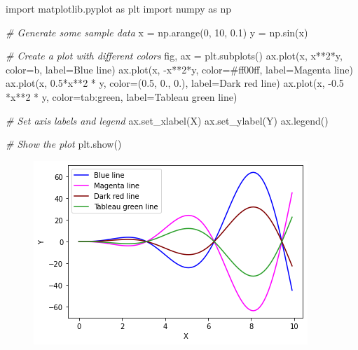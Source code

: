 \documentclass[11pt]{article}
\newenvironment{Shaded}{}{}
\newcommand{\DecValTok}[1]{\textcolor[rgb]{0.25,0.63,0.44}{{#1}}}
\newcommand{\FloatTok}[1]{\textcolor[rgb]{0.25,0.63,0.44}{{#1}}}
\newcommand{\StringTok}[1]{\textcolor[rgb]{0.25,0.44,0.63}{{#1}}}
\newcommand{\CommentTok}[1]{\textcolor[rgb]{0.38,0.63,0.69}{\textit{{#1}}}}
\newcommand{\NormalTok}[1]{{#1}}
\newcommand{\ImportTok}[1]{{#1}}
\newcommand{\OperatorTok}[1]{\textcolor[rgb]{0.40,0.40,0.40}{{#1}}}
\begin{document}
\begin{Shaded}
\begin{Highlighting}[]
\ImportTok{import}\NormalTok{ matplotlib.pyplot }\ImportTok{as}\NormalTok{ plt}
\ImportTok{import}\NormalTok{ numpy }\ImportTok{as}\NormalTok{ np}

\CommentTok{\# Generate some sample data}
\NormalTok{x }\OperatorTok{=}\NormalTok{ np.arange(}\DecValTok{0}\NormalTok{, }\DecValTok{10}\NormalTok{, }\FloatTok{0.1}\NormalTok{)}
\NormalTok{y }\OperatorTok{=}\NormalTok{ np.sin(x)}

\CommentTok{\# Create a plot with different colors}
\NormalTok{fig, ax }\OperatorTok{=}\NormalTok{ plt.subplots()}
\NormalTok{ax.plot(x, x}\OperatorTok{**}\DecValTok{2}\OperatorTok{*}\NormalTok{y, color}\OperatorTok{=}\StringTok{\textquotesingle{}b\textquotesingle{}}\NormalTok{, label}\OperatorTok{=}\StringTok{\textquotesingle{}Blue line\textquotesingle{}}\NormalTok{)}
\NormalTok{ax.plot(x, }\OperatorTok{{-}}\NormalTok{x}\OperatorTok{**}\DecValTok{2}\OperatorTok{*}\NormalTok{y, color}\OperatorTok{=}\StringTok{\textquotesingle{}\#ff00ff\textquotesingle{}}\NormalTok{, label}\OperatorTok{=}\StringTok{\textquotesingle{}Magenta line\textquotesingle{}}\NormalTok{)}
\NormalTok{ax.plot(x, }\FloatTok{0.5}\OperatorTok{*}\NormalTok{x}\OperatorTok{**}\DecValTok{2} \OperatorTok{*}\NormalTok{ y, color}\OperatorTok{=}\NormalTok{(}\FloatTok{0.5}\NormalTok{, }\FloatTok{0.}\NormalTok{, }\FloatTok{0.}\NormalTok{), label}\OperatorTok{=}\StringTok{\textquotesingle{}Dark red line\textquotesingle{}}\NormalTok{)}
\NormalTok{ax.plot(x, }\OperatorTok{{-}}\FloatTok{0.5} \OperatorTok{*}\NormalTok{x}\OperatorTok{**}\DecValTok{2} \OperatorTok{*}\NormalTok{ y, color}\OperatorTok{=}\StringTok{\textquotesingle{}tab:green\textquotesingle{}}\NormalTok{, label}\OperatorTok{=}\StringTok{\textquotesingle{}Tableau green line\textquotesingle{}}\NormalTok{)}

\CommentTok{\# Set axis labels and legend}
\NormalTok{ax.set\_xlabel(}\StringTok{\textquotesingle{}X\textquotesingle{}}\NormalTok{)}
\NormalTok{ax.set\_ylabel(}\StringTok{\textquotesingle{}Y\textquotesingle{}}\NormalTok{)}
\NormalTok{ax.legend()}

\CommentTok{\# Show the plot}
\NormalTok{plt.show()}
\end{Highlighting}
\end{Shaded}

\begin{figure}
\centering
\includegraphics[scale=0.6]{line_color.png}
\end{figure}
\end{document}

